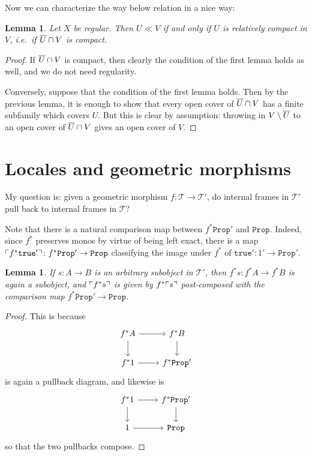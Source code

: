 \documentclass[11pt, oneside, article]{memoir}
\theoremstyle{plain}
\newtheorem{lemma}[theorem]{Lemma}
\theoremstyle{definition}
\theoremstyle{remark}
\DeclarePairedDelimiter{\classify}{\ulcorner}{\urcorner}
\newcommand{\const}[1]{\mathtt{#1}}
\newcommand{\Prop}{\const{Prop}}
\begin{document}
Now we can characterize the way below relation in a nice way:

\begin{lemma}
Let $X$ be regular. Then $U\ll V$ if and only if $U$ is relatively compact in $V$, i.e.~if $\overline{U}\cap V$ is compact.
\end{lemma}

\begin{proof}
If $\overline{U}\cap V$ is compact, then clearly the condition of the first lemma holds as well, and we do not need regularity.

Conversely, suppose that the condition of the first lemma holds. Then by the previous lemma, it is enough to show that every open cover of $\overline{U}\cap V$ has a finite subfamily which covers $U$. But this is clear by assumption: throwing in $V\setminus\overline{U}$ to an open cover of $\overline{U}\cap V$ gives an open cover of $V$.
\end{proof}

\section{Locales and geometric morphisms}

My question is: given a geometric morphism $f : \mathcal{T}\to\mathcal{T}'$, do internal frames in $\mathcal{T}'$ pull back to internal frames in $\mathcal{T}$?

Note that there is a natural comparison map between $f^*\Prop'$ and $\Prop$. Indeed, since $f^*$ preserves monos by virtue of being left exact, there is a map $\classify{f^*\const{true}'}\colon f^*\Prop'\to\Prop$ classifying the image under $f^*$ of $\const{true}'\colon 1'\to \Prop'$.

\begin{lemma}
If $s:A\to B$ is an arbitrary subobject in $\mathcal{T}'$, then $f^*s : f^*A\to f^*B$ is again a subobject, and $\classify{f^*s}$ is given by $f^*\classify{s}$ post-composed with the comparison map $f^*\Prop'\to\Prop$.
\end{lemma}

\begin{proof}
 This is because
\[\begin{tikzcd}
	f^*A \ar{r} \ar{d} & f^*B \ar{d} \\
	f^*1 \ar{r} & f^*\Prop'
\end{tikzcd}\]
is again a pullback diagram, and likewise is
\[\begin{tikzcd}
	f^*1 \ar{r} \ar{d} & f^*\Prop' \ar{d} \\
	1 \ar{r} & \Prop
\end{tikzcd}\]
so that the two pullbacks compose.
\end{proof}
\end{document}
